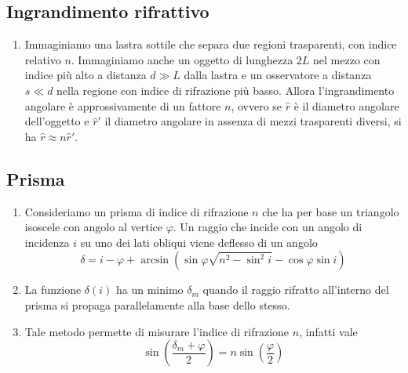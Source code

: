 \documentclass[a4paper,11pt]{article}
\begin{document}
\subsection{Ingrandimento rifrattivo}
\begin{enumerate}[resume]
	\item Immaginiamo una lastra sottile che separa due regioni trasparenti, con indice relativo $n$. Immaginiamo anche un oggetto di lunghezza $2L$ nel mezzo con indice più alto a distanza $d\gg L$ dalla lastra e un osservatore a distanza $s\ll d$ nella regione con indice di rifrazione più basso. Allora l'ingrandimento angolare è approssivamente di un fattore $n$, ovvero se $\hat{r}$ è il diametro angolare dell'oggetto e $\hat{r}'$ il diametro angolare in assenza di mezzi trasparenti diversi, si ha $\hat{r}\approx n\hat{r}'$.
\end{enumerate}
\subsection{Prisma}
\begin{enumerate}[resume]
	\item Consideriamo un prisma di indice di rifrazione $n$ che ha per base un triangolo isoscele con angolo al vertice $\varphi$. Un raggio che incide con un angolo di incidenza $i$ su uno dei lati obliqui viene deflesso di un angolo
	\[\delta=i-\varphi+\arcsin\left(\sin\varphi\sqrt{n^2-\sin^2i}-\cos\varphi\sin i\right)\]
	\item La funzione $\delta(i)$ ha un minimo $\delta_m$ quando il raggio rifratto all'interno del prisma si propaga parallelamente alla base dello stesso.
	\item Tale metodo permette di misurare l'indice di rifrazione $n$, infatti vale
	\[\sin\left(\frac{\delta_m+\varphi}{2}\right)=n\sin\left(\frac{\varphi}{2}\right)\]
\end{enumerate}
\end{document}
